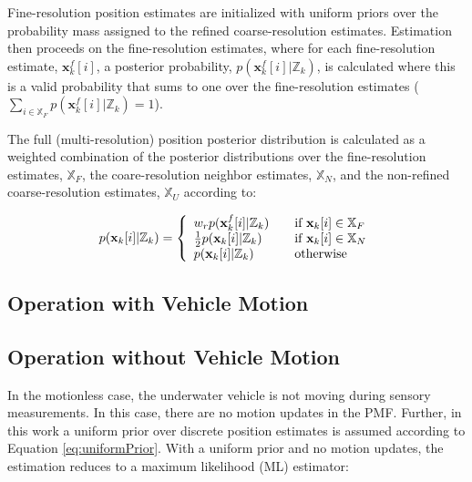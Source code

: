 Fine-resolution position estimates are initialized with uniform priors over the probability mass assigned to the refined coarse-resolution estimates.
Estimation then proceeds on the fine-resolution estimates, where for each fine-resolution estimate, $\mathbf{x}_k^{f}[i]$, a posterior probability, $p(\mathbf{x}_k^{f}[i] | \mathbb{Z}_k)$, is calculated where this is a valid probability that sums to one over the fine-resolution estimates ($ \sum_{i \in \mathbb{X}_F} p(\mathbf{x}_k^{f}[i] | \mathbb{Z}_k) = 1$).

The full (multi-resolution) position posterior distribution is calculated as a weighted combination of the posterior distributions over the fine-resolution estimates, $\mathbb{X}_F$,  the coare-resolution neighbor estimates, $\mathbb{X}_N$, and the non-refined coarse-resolution estimates, $\mathbb{X}_U$ according to:

\begin{align}
\begin{split}
p(\mathbf{x}_k[i] | \mathbb{Z}_k) = \left\{ 
  \begin{array}{l l}
    w_r p(\mathbf{x}_k^{f}[i] | \mathbb{Z}_k) & \quad \text{if $\mathbf{x}_k[i] \in \mathbb{X}_F$} \\
    \frac{1}{2} p(\mathbf{x}_k[i] | \mathbb{Z}_k) & \quad \text{if $\mathbf{x}_k[i] \in \mathbb{X}_N$} \\
    p(\mathbf{x}_k[i] | \mathbb{Z}_k) & \quad \text{otherwise}
  \end{array} \right.
\end{split}
\label{eq:posteriorProb}
\end{align}

\subsection{Operation with Vehicle Motion}
\label{framework.PMF.MotionCase}

\subsection{Operation without Vehicle Motion}
\label{framework.PMF.MotionlessCase}

In the motionless case, the underwater vehicle is not moving during sensory measurements.
In this case, there are no motion updates in the PMF.
Further, in this work a uniform prior over discrete position estimates is assumed according to Equation \ref{eq:uniformPrior}.
With a uniform prior and no motion updates, the estimation reduces to a maximum likelihood (ML) estimator:

